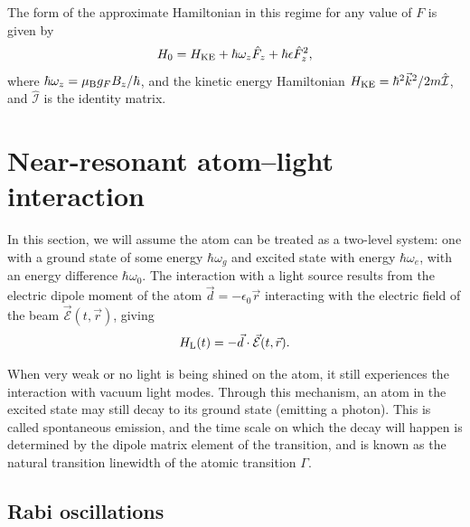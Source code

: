 The form of the approximate Hamiltonian in this regime for any value of $F$ is given by
\begin{equation}
H_0 = H_{\rm KE} + \hbar \omega_z \hat{F}_z + \hbar\epsilon \hat{F}_z^2,
\end{equation}
where $\hbar \omega_z = \mu_{\rm B} g_F B_z/\hbar$, and the kinetic energy Hamiltonian $H_{\rm KE} = \hbar^2 \vec{k}^2/2m \hat{\mathcal{I}}$, and $\hat{\mathcal{I}}$ is the identity matrix.

\section{Near-resonant atom--light interaction}\label{sec:NRatomLight}

In this section, we will assume the atom can be treated as a two-level system: one with a ground state of some energy $\hbar\omega_g$ and excited state with energy $\hbar\omega_e$, with an energy difference $\hbar\omega_0$. The interaction with a light source results from the electric dipole moment of the atom $\vec{d}=-\epsilon_0\vec{r}$ interacting with the electric field of the beam $\vec{\mathcal{E}}(t,\vec{r})$, giving\cite{Fox}
\begin{equation}
H_{\rm L}(t) = -\vec{d}\cdot\vec{\mathcal{E}}(t,\vec{r}).
\label{eqn:atomlight}
\end{equation}

When very weak or no light is being shined on the atom, it still experiences the interaction with vacuum light modes. Through this mechanism, an atom in the excited state may still decay to its ground state (emitting a photon). This is called spontaneous emission, and the time scale on which the decay will happen is determined by the dipole matrix element of the transition, and is known as the  natural transition linewidth of the atomic transition $\Gamma$\cite{Fox}.

\subsection{Rabi oscillations}\label{sec:Rabi}


